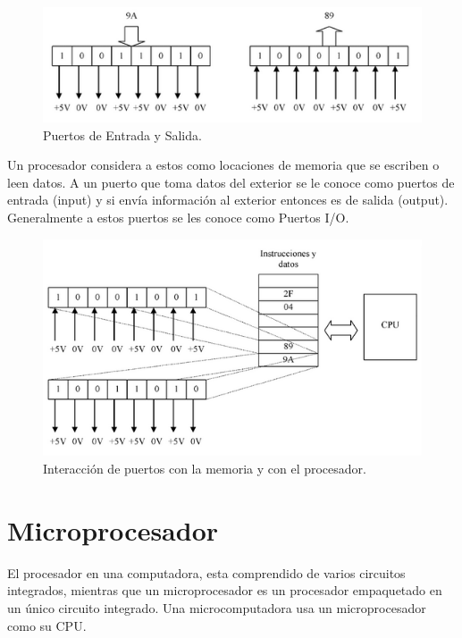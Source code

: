 \documentclass[letterpaper,12pt,oneside]{book}
\begin{document}
				\begin{figure}[!htpb]
					\centering
					\includegraphics[scale = 1.0]{Material de Consulta/PuertosE-S.PNG}
					\caption[Puertos de Entrada y Salida]{Puertos de Entrada y Salida.}
					\label{PrtsES}
				\end{figure}

				Un procesador considera a estos como locaciones de memoria que se escriben o leen datos. A un puerto que toma datos del exterior se le conoce como puertos de entrada (input) y si envía información al exterior entonces es de salida (output). Generalmente a estos puertos se les conoce como Puertos I/O.

				\begin{figure}[!htpb]
					\centering
					\includegraphics[scale = 1.0]{Material de Consulta/PrtsIO.PNG}
					\caption[Memoria y Puertos I/O]{Interacción de puertos con la memoria y con el procesador.}
					\label{PrtsIO}
				\end{figure}
		\section{Microprocesador}
		El procesador en una computadora, esta comprendido de varios circuitos integrados, mientras que un microprocesador es un procesador empaquetado en un único circuito integrado. Una microcomputadora usa un microprocesador como su CPU\cite{valdes2007microcontroladores}.
\end{document}
